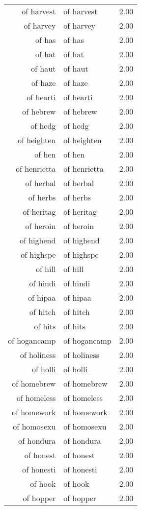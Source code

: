 \begin{table}[ht]
\begin{tabular}{rlr}
  of harvest & of harvest & 2.00 \\ 
  of harvey & of harvey & 2.00 \\ 
  of has & of has & 2.00 \\ 
  of hat & of hat & 2.00 \\ 
  of haut & of haut & 2.00 \\ 
  of haze & of haze & 2.00 \\ 
  of hearti & of hearti & 2.00 \\ 
  of hebrew & of hebrew & 2.00 \\ 
  of hedg & of hedg & 2.00 \\ 
  of heighten & of heighten & 2.00 \\ 
  of hen & of hen & 2.00 \\ 
  of henrietta & of henrietta & 2.00 \\ 
  of herbal & of herbal & 2.00 \\ 
  of herbs & of herbs & 2.00 \\ 
  of heritag & of heritag & 2.00 \\ 
  of heroin & of heroin & 2.00 \\ 
  of highend & of highend & 2.00 \\ 
  of highspe & of highspe & 2.00 \\ 
  of hill & of hill & 2.00 \\ 
  of hindi & of hindi & 2.00 \\ 
  of hipaa & of hipaa & 2.00 \\ 
  of hitch & of hitch & 2.00 \\ 
  of hits & of hits & 2.00 \\ 
  of hogancamp & of hogancamp & 2.00 \\ 
  of holiness & of holiness & 2.00 \\ 
  of holli & of holli & 2.00 \\ 
  of homebrew & of homebrew & 2.00 \\ 
  of homeless & of homeless & 2.00 \\ 
  of homework & of homework & 2.00 \\ 
  of homosexu & of homosexu & 2.00 \\ 
  of hondura & of hondura & 2.00 \\ 
  of honest & of honest & 2.00 \\ 
  of honesti & of honesti & 2.00 \\ 
  of hook & of hook & 2.00 \\ 
  of hopper & of hopper & 2.00 \\ 

\end{tabular}
\end{table}

